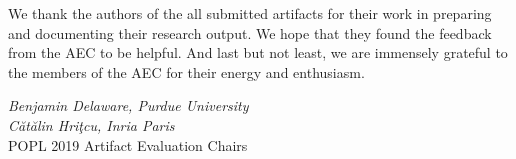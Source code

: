 We thank the authors of the all submitted artifacts for their work in
preparing and documenting their research output. We hope that they
found the feedback from the AEC to be helpful. And last but not least,
we are immensely grateful to the members of the AEC for their energy
and enthusiasm.

\begin{flushright}
\textit{Benjamin Delaware, Purdue University} \\
\textit{C\u{a}t\u{a}lin Hri\c{t}cu, Inria Paris} \\
POPL 2019 Artifact Evaluation Chairs
\medskip \\
\end{flushright}

\newpage
